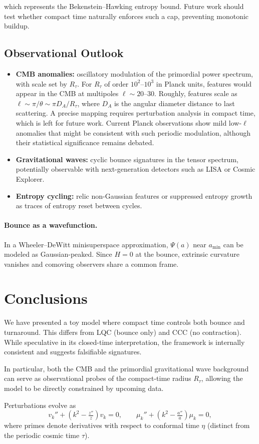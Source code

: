\documentclass[12pt]{article}
\begin{document}
which represents the Bekenstein--Hawking entropy bound. Future work should test whether
compact time naturally enforces such a cap, preventing monotonic buildup.

\subsection*{Observational Outlook}
\begin{itemize}
    \item \textbf{CMB anomalies:} oscillatory modulation of the primordial power spectrum,
    with scale set by $R_\tau$. For $R_\tau$ of order $10^2$--$10^3$ in Planck units,
    features would appear in the CMB at multipoles $\ell \sim 20$--30. Roughly, features
    scale as $\ell \sim \pi/\theta \sim \pi D_A / R_\tau$, where $D_A$ is the angular
    diameter distance to last scattering. A precise mapping requires perturbation analysis
    in compact time, which is left for future work. Current Planck observations show mild
    low-$\ell$ anomalies that might be consistent with such periodic modulation, although
    their statistical significance remains debated.
    \item \textbf{Gravitational waves:} cyclic bounce signatures in the tensor spectrum,
    potentially observable with next-generation detectors such as LISA or Cosmic Explorer.
    \item \textbf{Entropy cycling:} relic non-Gaussian features or suppressed entropy
    growth as traces of entropy reset between cycles.
\end{itemize}

\paragraph{Bounce as a wavefunction.}
In a Wheeler--DeWitt minisuperspace approximation, $\Psi(a)$ near $a_{\min}$ can be modeled
as Gaussian-peaked. Since $H=0$ at the bounce, extrinsic curvature vanishes and comoving
observers share a common frame.

\section{Conclusions}
We have presented a toy model where compact time controls both bounce and turnaround.
This differs from LQC (bounce only) and CCC (no contraction). While speculative in its
closed-time interpretation, the framework is internally consistent and suggests
falsifiable signatures.

In particular, both the CMB and the primordial gravitational wave background can serve
as observational probes of the compact-time radius $R_\tau$, allowing the model to be
directly constrained by upcoming data.

Perturbations evolve as
\[
v_k''+(k^2-\tfrac{z''}{z})v_k=0,\qquad
\mu_k''+(k^2-\tfrac{a''}{a})\mu_k=0,
\]
where primes denote derivatives with respect to conformal time $\eta$ (distinct from
the periodic cosmic time $\tau$).

\printbibliography
\end{document}
